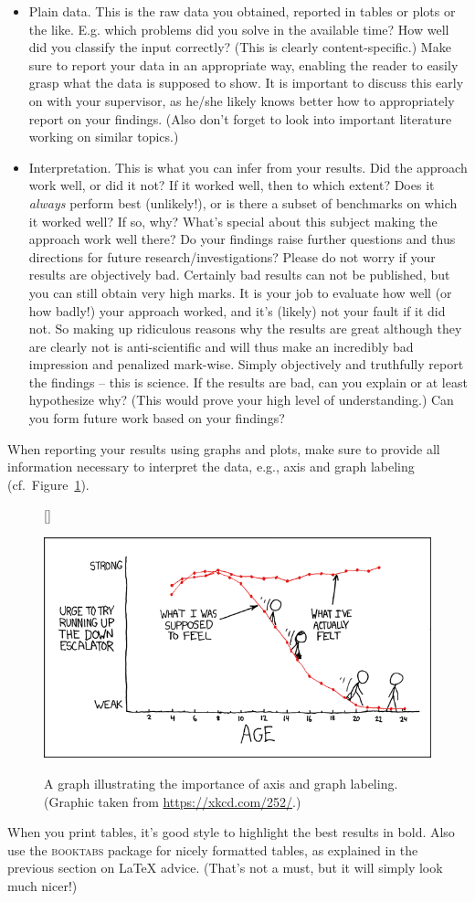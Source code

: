 \begin{itemize}
  \item Plain data. This is the raw data you obtained, reported in tables or plots or the like. E.g. which problems did you solve in the available time? How well did you classify the input correctly? (This is clearly content-specific.) Make sure to report your data in an appropriate way, enabling the reader to easily grasp what the data is supposed to show. It is important to discuss this early on with your supervisor, as he/she likely knows better how to appropriately report on your findings. (Also don't forget to look into important literature working on similar topics.)
  \item Interpretation. This is what you can infer from your results. Did the approach work well, or did it not? If it worked well, then to which extent? Does it \emph{always} perform best (unlikely!), or is there a subset of benchmarks on which it worked well? If so, why? What's special about this subject making the approach work well there? Do your findings raise further questions and thus directions for future research/investigations? Please do not worry if your results are objectively bad. Certainly bad results can not be published, but you can still obtain very high marks. It is your job to evaluate how well (or how badly!) your approach worked, and it's (likely) not your fault if it did not. So making up ridiculous reasons why the results are great although they are clearly not is anti-scientific and will thus make an incredibly bad impression and penalized mark-wise. Simply objectively and truthfully report the findings -- this is science. If the results are bad, can you explain or at least hypothesize why? (This would prove your high level of understanding.) Can you form future work based on your findings?
\end{itemize}

When reporting your results using graphs and plots, make sure to provide all information necessary to interpret the data, e.g., axis and graph labeling (cf.~Figure~\ref{fig:xkcd}).

  \begin{figure}[bh!]
  [\FBwidth]
  {\caption{A graph illustrating the importance of axis and graph labeling. (Graphic taken from \url{https://xkcd.com/252/}.)\label{fig:xkcd}}}
  {\includegraphics[width=.45\textwidth]{figures/escalators.png}}
  \end{figure}

When you print tables, it's good style to highlight the best results in bold. Also use the \textsc{booktabs} package for nicely formatted tables, as explained in the previous section on \LaTeX{} advice. (That's not a must, but it will simply look much nicer!)